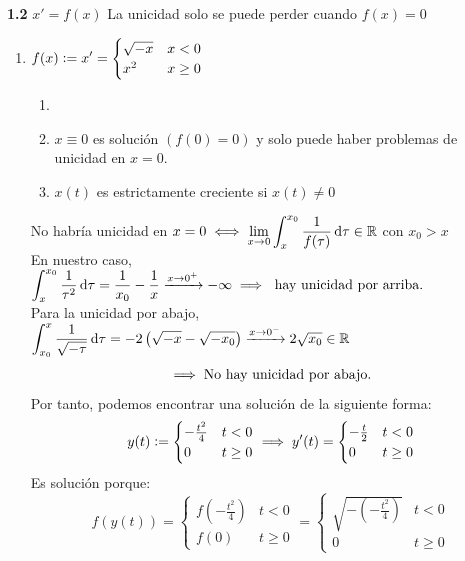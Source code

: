 \textbf{1.2} $x'=f(x)$ La unicidad solo se puede perder cuando $f(x)=0$
\begin{enumerate}
	\item $\displaystyle f(x)\vcentcolon= x'=\begin{cases}
			      \sqrt{-x} & x<0     \\
			      x^2       & x\geq 0
		      \end{cases}$
	      \begin{obs}\begin{enumerate}
			      \item[]
			      \item $x\equiv 0$ es solución $\left(f(0)=0\right)$ y solo puede haber problemas de unicidad en $x=0$.
			      \item $x(t)$ es estrictamente creciente si $x(t)\ne 0$
		      \end{enumerate}\end{obs}
	      No habría unicidad en $\ds x=0 \iff \lim_{x\to 0} \int_{x}^{x_0} \frac{1}{f(\tau)} \odif{\tau} \in \R$ con $x_0>x$ \\
	      En nuestro caso, $\ds \int_{x}^{x_0} \frac{1}{\tau^2} \odif{\tau} = \frac{1}{x_0} - \frac{1}{x} \xrightarrow{x\to 0^+} -\infty \implies \tex{ hay unicidad por arriba.}$ \\
	      Para la unicidad por abajo, $\ds \int_{x_0}^{x} \frac{1}{\sqrt{-\tau}} \odif{\tau} = -2\left(\sqrt{-x} - \sqrt{-x_0}\right) \xrightarrow{x\to 0^-} 2 \sqrt{x_0} \in \R$
	      \[\implies \text{No hay unicidad por abajo.}\]
	      Por tanto, podemos encontrar una solución de la siguiente forma:
	      \[y(t)\vcentcolon= \begin{cases}
			      -\frac{t^2}{4} & t<0     \\
			      0              & t\geq 0
		      \end{cases} \implies y'(t)=\begin{cases}
			      -\frac{t}{2} & t<0     \\
			      0            & t\geq 0
		      \end{cases}\]
	      Es solución porque:
	      \[f(y(t))=\begin{cases}
			      f(-\frac{t^2}{4}) & t<0     \\
			      f(0)              & t\geq 0
		      \end{cases} = \begin{cases}
			      \sqrt{-\left(-\frac{t^2}{4}\right)} & t<0     \\
			      0                                   & t\geq 0

\end{cases}\]
\end{enumerate}

